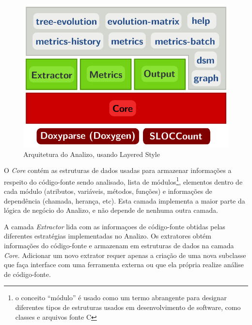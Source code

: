 \begin{figure}[h]
\center
\includegraphics[scale=0.3]{imagens/analizo-architecture.png}
\caption{Arquitetura do Analizo, usando Layered Style \cite{Clements2002}}
\label{arquitetura-analizo}
\end{figure}

O {\it Core} contém as estruturas de dados usadas para armazenar informações a
respeito do código-fonte sendo analisado, lista de módulos\footnote{o
conceito ``módulo'' é usado como um termo abrangente para designar diferentes
tipos de estruturas usados em desenvolvimento de software, como classes e
arquivos fonte C}, elementos dentro de cada módulo (atributos, variáveis,
métodos, funções) e informações de dependência (chamada, herança, etc). Esta
camada implementa a maior parte da lógica de negócio do Analizo, e não depende
de nenhuma outra camada.

A camada {\it Extractor} lida com as informaçoes de código-fonte obtidas pelas
diferentes estratégias implementadas no Analizo. Os extratores obtém
informações do código-fonte e armazenam em estruturas de dados na camada {\it
Core}. Adicionar um novo extrator requer apenas a criação de uma nova subclasse
que faça interface com uma ferramenta externa ou que ela própria realize análise
de código-fonte.


